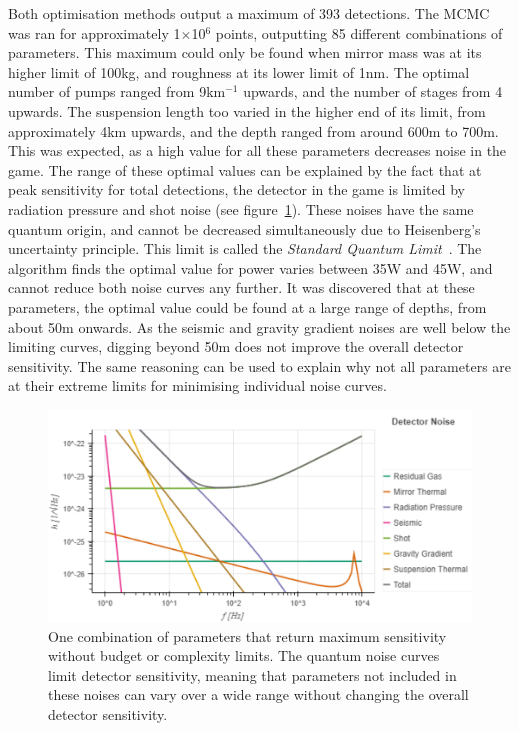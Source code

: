 \documentclass{article}
\begin{document}
Both optimisation methods output a maximum of 393 detections. The MCMC
was ran for approximately 1$\times$10$^6$ points, outputting 85
different combinations of parameters. This maximum could only be found
when mirror mass was at its higher limit of 100kg, and roughness at
its lower limit of 1nm. The optimal number of pumps ranged from
9km$^{-1}$ upwards, and the number of stages from 4 upwards. The
suspension length too varied in the higher end of its limit, from
approximately 4km upwards, and the depth ranged from around 600m to
700m. This was expected, as a high value for all these parameters
decreases noise in the game. The range of these optimal values can be
explained by the fact that at peak sensitivity for total detections,
the detector in the game is limited by radiation pressure and shot
noise (see figure~\ref{fig::SPQMaxNoLim}). These noises have the same
quantum origin, and cannot be decreased simultaneously due to
Heisenberg's uncertainty principle. This limit is called the
\textit{Standard Quantum Limit}~\cite{danilishin}. The algorithm finds
the optimal value for power varies between 35W and 45W, and cannot
reduce both noise curves any further. It was discovered that at these
parameters, the optimal value could be found at a large range of
depths, from about 50m onwards. As the seismic and gravity gradient
noises are well below the limiting curves, digging beyond 50m does not
improve the overall detector sensitivity. The same reasoning can be
used to explain why not all parameters are at their extreme limits for
minimising individual noise curves. 

\begin{figure}[h!]
    \centering
    \includegraphics[scale=0.55]{SPQMaxNoLim.pdf}
    \captionsetup{width=0.9\textwidth}
    \caption{One combination of parameters that return maximum
      sensitivity without budget or complexity limits. The quantum
      noise curves limit detector sensitivity, meaning that parameters
      not included in these noises can vary over a wide range without
      changing the overall detector sensitivity.}
    \label{fig::SPQMaxNoLim}
\end{figure}
\end{document}

